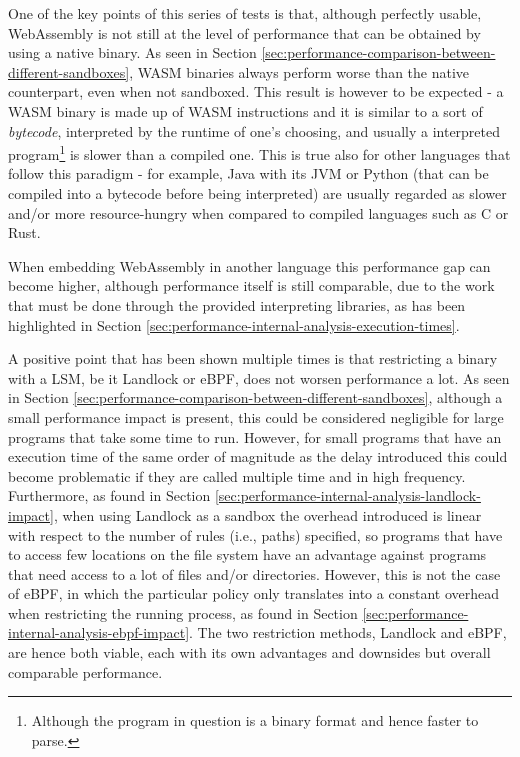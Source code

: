 One of the key points of this series of tests is that, although perfectly usable,
WebAssembly is not still at the level of performance that can be obtained by using a native binary.
As seen in Section \ref{sec:performance-comparison-between-different-sandboxes}, WASM binaries
always perform worse than the native counterpart, even when not sandboxed.
This result is however to be expected - a WASM binary is made up of WASM instructions and
it is similar to a sort of \textit{bytecode}, interpreted by the runtime of one's choosing,
and usually a interpreted program\footnote{Although the program in question is a binary format and hence faster to parse.}
is slower than a compiled one.
This is true also for other languages that follow this paradigm - for example, Java with its JVM
or Python (that can be compiled into a bytecode before being interpreted) are usually regarded as
slower and/or more resource-hungry when compared to compiled languages such as C or Rust.

When embedding WebAssembly in another language this performance gap can become higher,
although performance itself is still comparable, due to
the work that must be done through the provided interpreting libraries, as has been
highlighted in Section \ref{sec:performance-internal-analysis-execution-times}. 

A positive point that has been shown multiple times is that restricting a binary
with a LSM, be it Landlock or eBPF, does not worsen performance a lot.
As seen in Section \ref{sec:performance-comparison-between-different-sandboxes}, although a small
performance impact is present, this could be considered negligible for large programs that take
some time to run. However, for small programs that have an execution time of the same order of magnitude
as the delay introduced this could become problematic if they are called multiple time
and in high frequency.
Furthermore, as found in Section \ref{sec:performance-internal-analysis-landlock-impact}, when using Landlock
as a sandbox the overhead introduced is linear with respect to the number of rules (i.e., paths) specified,
so programs that have to access few locations on the file system have an advantage against programs that need
access to a lot of files and/or directories.
However, this is not the case of eBPF, in which the particular policy only translates into a constant overhead
when restricting the running process, as found in Section \ref{sec:performance-internal-analysis-ebpf-impact}.
The two restriction methods, Landlock and eBPF, are hence both viable, each with its own advantages and downsides
but overall comparable performance.